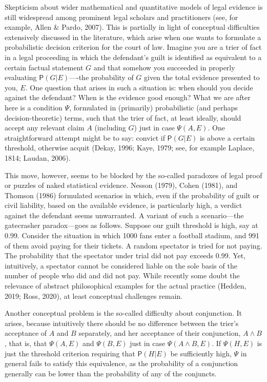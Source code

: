 \documentclass[11pt,dvipsnames,enabledeprecatedfontcommands]{scrartcl}
\newcommand{\pr}[1]{\mathsf{P}(#1)}
\begin{document}
Skepticism about wider mathematical and quantitative models of legal
evidence is still widespread among prominent legal scholars and
practitioners (see, for example, Allen \& Pardo, 2007). This is
partially in light of conceptual difficulties extensively discussed in
the literature, which arise when one wants to formulate a probabilistic
decision criterion for the court of law. Imagine you are a trier of fact
in a legal proceeding in which the defendant's guilt is identified as
equivalent to a certain factual statement \(G\) and that somehow you
succeeded in properly evaluating \(\pr{G\vert E}\)----the probability of
\(G\) given the total evidence presented to you, \(E\). One question
that arises in such a situation is: when should you decide against the
defendant? When is the evidence good enough? What we are after here is a
condition \(\Psi\), formulated in (primarily) probabilistic (and perhaps
decision-theoretic) terms, such that the trier of fact, at least
ideally, should accept any relevant claim \(A\) (including \(G\)) just
in case \(\Psi(A, E)\). One straightforward attempt might be to say:
convict if \(\pr{G\vert E}\) is above a certain threshold, otherwise
acquit (Dekay, 1996; Kaye, 1979; see, for example Laplace, 1814; Laudan,
2006).

This move, however, seems to be blocked by the so-called paradoxes of
legal proof or puzzles of naked statistical evidence. Nesson (1979),
Cohen (1981), and Thomson (1986) formulated scenarios in which, even if
the probability of guilt or civil liability, based on the available
evidence, is particularly high, a verdict against the defendant seems
unwarranted. A variant of such a scenario---the gatecrasher
paradox---goes as follows. Suppose our guilt threshold is high, say at
0.99. Consider the situation in which 1000 fans enter a football
stadium, and 991 of them avoid paying for their tickets. A random
spectator is tried for not paying. The probability that the spectator
under trial did not pay exceeds 0.99. Yet, intuitively, a spectator
cannot be considered liable on the sole basis of the number of people
who did and did not pay. While recently some doubt the relevance of
abstract philosophical examples for the actual practice (Hedden, 2019;
Ross, 2020), at least conceptual challenges remain.

Another conceptual problem is the so-called difficulty about
conjunction. It arises, because intuitively there should be no
difference between the trier's acceptance of \(A\) and \(B\) separately,
and her acceptance of their conjunction, \(A\wedge B\), that is, that
\(\Psi(A,E)\) and \(\Psi(B,E)\) just in case \(\Psi(A\wedge B, E)\). If
\(\Psi(H,E)\) is just the threshold criterion requiring that
\(\pr{H\vert E}\) be sufficiently high, \(\Psi\) in general fails to
satisfy this equivalence, as the probability of a conjunction generally
can be lower than the probability of any of the conjuncts.
\end{document}
